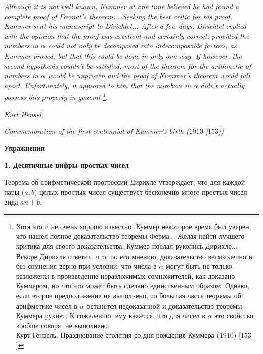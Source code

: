 \hangindent=3cm 
\textit{Although it is not well known, Kummer at one time believed he had found a complete proof of Fermat's theorem... Seeking the
best critic for his proof, Kummer sent his manu\-script to Dirichlet...
After a few days, Dirichlet replied with the opinion that the proof
was excellent and certainly correct, provided the numbers in $\alpha$ could
not only be decomposed into indecomposable factors, as Kummer
proved, but that this could be done in only one way. If however,
the second hypothesis couldn't be satisfied, most of the theorem for
the arithmetic of numbers in $\alpha$ would be unproven and the proof
of Kummer's theorem would fall apart. Unfortunately, it appeared to him that the numbers in $\alpha$ didn't actually possess this property in
general \footnote{Хотя это и не очень хорошо известно, Куммер некоторое время был уверен, что нашел полное доказательство теоремы Ферма... Желая найти лучшего критика для своего доказательства, Куммер послал рукопись Дирихле... Вскоре Дирихле ответил, что, по его мнению, доказательство великолепно и без сомнения верно при условии, что числа в $\alpha$ могут быть не только разложены в произведение неразложимых сомножителей, как доказано Куммером, но что это может быть сделано единственным образом. Однако, если второе предположение не выполнено, то большая часть теоремы об арифметике чисел в $\alpha$ останется недоказанной и доказательство теоремы Куммера рухнет. К сожалению, ему кажется, что для чисел в $\alpha$ это свойство,
вообще говоря, не выполнено. \\ \indent Курт Генэель, Празднование столетия со дня рождения Куммера ($1910$) [$153$]}.}

\begin{flushright}
\textit{Kurt Hensel,}

\textit{Commemoration of the first centennial of Kummer's birth ($1910$ [$153$])}
\end{flushright}


\newpage

\begin{center}
\Large\textbf{Упражнения}
\end{center}
\cleartop

\vspace{20pt}

\noindent \textbf{1. Десятичные цифры простых чисел}

Теорема об арифметической прогрессии Дирихле утверждает, что
для каждой пары ($a, b$) целых простых чисел существует бесконечно
много простых чисел вида $an+b$. 

